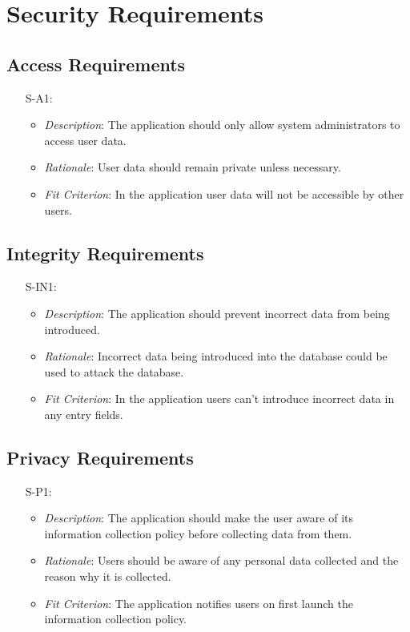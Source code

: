 \documentclass[12pt]{article}
\begin{document}
\section{Security Requirements}
\subsection{Access Requirements}
\noindent \begin{itemize}
    \item[S-A1:] 
        \begin{itemize}
           \item \textit{Description}: The application should only allow system administrators to access user data.
            \item \textit{Rationale}: User data should remain private unless necessary.
            \item \textit{Fit Criterion}: In the application user data will not be accessible by other users.
        \end{itemize}
\end{itemize}
\subsection{Integrity Requirements}
\noindent \begin{itemize}
    \item[S-IN1:] 
        \begin{itemize}
           \item \textit{Description}: The application should prevent incorrect data from being introduced.
            \item \textit{Rationale}: Incorrect data being introduced into the database could be used to attack the database.
            \item \textit{Fit Criterion}: In the application users can't introduce incorrect data in any entry fields.
        \end{itemize}
\end{itemize}
\subsection{Privacy Requirements}
\noindent \begin{itemize}
    \item[S-P1:] 
        \begin{itemize}
            \item \textit{Description}: The application should make the user aware of its information collection policy before collecting data from them.
            \item \textit{Rationale}: Users should be aware of any personal data collected and the reason why it is collected.
            \item \textit{Fit Criterion}: The application notifies users on first launch the information collection policy.
        \end{itemize}
\end{itemize}
\end{document}
